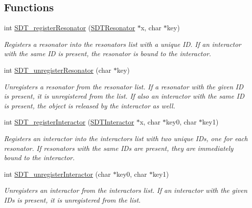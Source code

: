 \subsection*{Functions}
\begin{DoxyCompactItemize}
\item 
int \hyperlink{group__solids_gaffc95f5df4212748c12a6c55f8461433}{S\+D\+T\+\_\+register\+Resonator} (\hyperlink{group__resonators_ga07d183de45e9713277c8f62d93d9be9c}{S\+D\+T\+Resonator} $\ast$x, char $\ast$key)
\begin{DoxyCompactList}\small\item\em Registers a resonator into the resonators list with a unique I\+D. If an interactor with the same I\+D is present, the resonator is bound to the interactor. \end{DoxyCompactList}\item 
int \hyperlink{group__solids_gacccd077a38a5fa07ee1b15794367a82b}{S\+D\+T\+\_\+unregister\+Resonator} (char $\ast$key)
\begin{DoxyCompactList}\small\item\em Unregisters a resonator from the resonator list. If a resonator with the given I\+D is present, it is unregistered from the list. If also an interactor with the same I\+D is present, the object is released by the interactor as well. \end{DoxyCompactList}\item 
int \hyperlink{group__solids_gae0087b21c1611fcfb1e679856fc8a1d6}{S\+D\+T\+\_\+register\+Interactor} (\hyperlink{group__interactor_gacd68aba5c96532193d9cbc8dfa8f1c8c}{S\+D\+T\+Interactor} $\ast$x, char $\ast$key0, char $\ast$key1)
\begin{DoxyCompactList}\small\item\em Registers an interactor into the interactors list with two unique I\+Ds, one for each resonator. If resonators with the same I\+Ds are present, they are immediately bound to the interactor. \end{DoxyCompactList}\item 
int \hyperlink{group__solids_ga76b9f01d7a3a55eee9df3a32c810109a}{S\+D\+T\+\_\+unregister\+Interactor} (char $\ast$key0, char $\ast$key1)
\begin{DoxyCompactList}\small\item\em Unregisters an interactor from the interactors list. If an interactor with the given I\+Ds is present, it is unregistered from the list. \end{DoxyCompactList}\end{DoxyCompactItemize}


